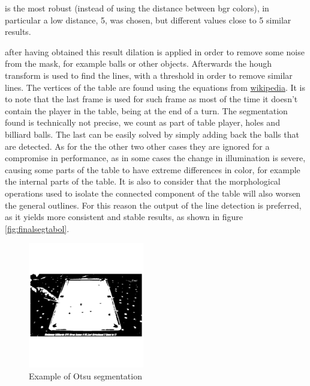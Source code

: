 is the most robust (instead of using the distance between bgr colors), in particular a low distance, 5, was chosen, but different values close to 5 similar results.\par
after having obtained this result dilation is applied in order to remove some noise from the mask,
for example balls or other objects. Afterwards the hough transform is used to find the lines, 
with a threshold in order to remove similar lines.
The vertices of the table are found using the equations from \href{https://en.wikipedia.org/wiki/Line\%E2\%80\%93line\_intersection}{wikipedia}.
It is to note that the last frame is used for such frame as most of the time it doesn't contain the player in the table, being at the end of
a turn.
The segmentation found is technically not precise, we count as part of table player, holes and billiard balls. The last can be easily solved by simply adding back the balls that are detected. 
As for the the other two other cases they are ignored for a compromise in performance, as in some
cases the change in illumination is severe, causing some parts of the table to have extreme 
differences in color, for example the internal parts of the table. It is also to consider that the morphological operations used to isolate the connected component of the table will also worsen
the general outlines. For this reason the output of the line detection is preferred, as it yields
more consistent and stable results, as shown in figure \ref{fig:finalsegtabol}.

\begin{figure}[h!]
    \centering
    \includegraphics[width=0.45\textwidth]{./imgs/otsu_table.png}
    \caption{Example of Otsu segmentation}
\end{figure}


